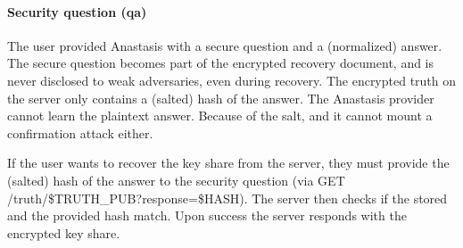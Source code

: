 \paragraph{Security question (qa)}

The user provided Anastasis with a secure question and a (normalized)
answer.  The secure question becomes part of the encrypted recovery
document, and is never disclosed to weak adversaries, even during
recovery.  The encrypted truth on the server only contains a (salted)
hash of the answer. The Anastasis provider cannot learn the plaintext
answer. Because of the salt, and it cannot mount a confirmation attack
either.

If the user wants to recover the key share from the server, they must
provide the (salted) hash of the answer to the security question (via
GET /truth/\$TRUTH\_PUB?response=\$HASH). The server then checks if the
stored and the provided hash match. Upon success the server responds
with the encrypted key share.
